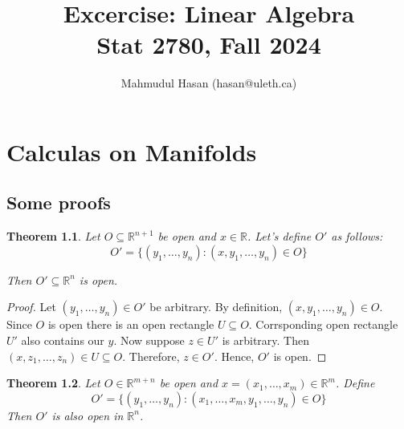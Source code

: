 \documentclass[12pt]{book}
\title{Excercise: Linear Algebra\\
\large{Stat 2780, Fall 2024}}
\author{Mahmudul Hasan (hasan@uleth.ca)\\
}
\newtheorem{theorem}{Theorem}
\begin{document}
% 

\chapter{Calculas on Manifolds}
\section{Some proofs}
% 

\begin{theorem}
  Let $O \subseteq \mathbb{R}^{n+1}$ be open and $x\in \mathbb{R}$. Let's define $O'$ as follows:
  \[
  O' = \{(y_1, \ldots, y_n) : (x,y_1, \ldots, y_n) \in O \}
  \]

  Then $O' \subseteq \mathbb{R}^n$ is open. 
\end{theorem}

\begin{proof}
  Let $(y_1, \ldots, y_n) \in O'$ be arbitrary. By definition, $(x, y_1, \ldots, y_n) \in O$. Since $O$ is open there is an open rectangle $U \subseteq O$. Corrsponding open rectangle $U'$ also contains our $y$. Now suppose $z \in U'$ is arbitrary. Then $(x, z_1, \ldots, z_n) \in U \subseteq O$. Therefore, $z \in O'$. Hence, $O'$ is open. 
\end{proof}


\begin{theorem}
  Let $O \in \mathbb{R}^{m+n}$ be open and $x = (x_1, \ldots, x_m) \in \mathbb{R}^m$. Define
  \[
  O' = \{(y_1, \ldots, y_n) : (x_1, \ldots, x_m, y_1, \ldots, y_n) \in O \}
  \]
  Then $O'$ is also open in $\mathbb{R}^n$. 
\end{theorem}
\end{document}
